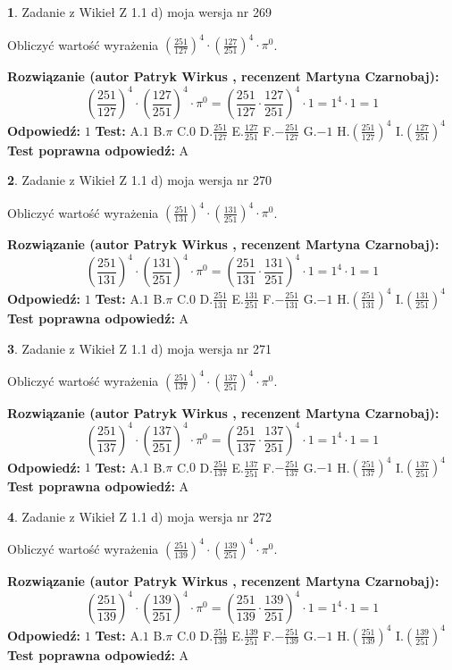 \documentclass[12pt, a4paper]{article}
\theoremstyle{definition} %
\newtheorem{zad}{}
\newcommand{\zadStart}[1]{\begin{zad}#1\newline}
\newcommand{\zadStop}{\end{zad}}
\newcommand{\rozwStart}[2]{\noindent \textbf{Rozwiązanie (autor #1 , recenzent #2): }\newline}
\newcommand{\rozwStop}{\newline}
\newcommand{\odpStart}{\noindent \textbf{Odpowiedź:}\newline}
\newcommand{\odpStop}{\newline}
\newcommand{\testStart}{\noindent \textbf{Test:}\newline}
\newcommand{\testStop}{\newline}
\newcommand{\kluczStart}{\noindent \textbf{Test poprawna odpowiedź:}\newline}
\newcommand{\kluczStop}{\newline}
\begin{document}
\zadStart{Zadanie z Wikieł Z 1.1 d) moja wersja nr 269}

Obliczyć wartość wyrażenia $(\frac{251}{127})^{4} \cdot (\frac{127}{251})^{4} \cdot \pi^{0}$.
\zadStop
\rozwStart{Patryk Wirkus}{Martyna Czarnobaj}
$$(\frac{251}{127})^{4} \cdot (\frac{127}{251})^{4} \cdot \pi^{0} = (\frac{251}{127} \cdot \frac{127}{251})^{4} \cdot 1 = 1^{4} \cdot 1 = 1$$
\rozwStop
\odpStart
$1$
\odpStop
\testStart
A.$1$ B.$\pi$ C.$0$ D.$\frac{251}{127}$ E.$\frac{127}{251}$
F.$-\frac{251}{127}$ G.$-1$
H.$(\frac{251}{127})^{4}$
I.$(\frac{127}{251})^{4}$
\testStop
\kluczStart
A
\kluczStop



\zadStart{Zadanie z Wikieł Z 1.1 d) moja wersja nr 270}

Obliczyć wartość wyrażenia $(\frac{251}{131})^{4} \cdot (\frac{131}{251})^{4} \cdot \pi^{0}$.
\zadStop
\rozwStart{Patryk Wirkus}{Martyna Czarnobaj}
$$(\frac{251}{131})^{4} \cdot (\frac{131}{251})^{4} \cdot \pi^{0} = (\frac{251}{131} \cdot \frac{131}{251})^{4} \cdot 1 = 1^{4} \cdot 1 = 1$$
\rozwStop
\odpStart
$1$
\odpStop
\testStart
A.$1$ B.$\pi$ C.$0$ D.$\frac{251}{131}$ E.$\frac{131}{251}$
F.$-\frac{251}{131}$ G.$-1$
H.$(\frac{251}{131})^{4}$
I.$(\frac{131}{251})^{4}$
\testStop
\kluczStart
A
\kluczStop



\zadStart{Zadanie z Wikieł Z 1.1 d) moja wersja nr 271}

Obliczyć wartość wyrażenia $(\frac{251}{137})^{4} \cdot (\frac{137}{251})^{4} \cdot \pi^{0}$.
\zadStop
\rozwStart{Patryk Wirkus}{Martyna Czarnobaj}
$$(\frac{251}{137})^{4} \cdot (\frac{137}{251})^{4} \cdot \pi^{0} = (\frac{251}{137} \cdot \frac{137}{251})^{4} \cdot 1 = 1^{4} \cdot 1 = 1$$
\rozwStop
\odpStart
$1$
\odpStop
\testStart
A.$1$ B.$\pi$ C.$0$ D.$\frac{251}{137}$ E.$\frac{137}{251}$
F.$-\frac{251}{137}$ G.$-1$
H.$(\frac{251}{137})^{4}$
I.$(\frac{137}{251})^{4}$
\testStop
\kluczStart
A
\kluczStop



\zadStart{Zadanie z Wikieł Z 1.1 d) moja wersja nr 272}

Obliczyć wartość wyrażenia $(\frac{251}{139})^{4} \cdot (\frac{139}{251})^{4} \cdot \pi^{0}$.
\zadStop
\rozwStart{Patryk Wirkus}{Martyna Czarnobaj}
$$(\frac{251}{139})^{4} \cdot (\frac{139}{251})^{4} \cdot \pi^{0} = (\frac{251}{139} \cdot \frac{139}{251})^{4} \cdot 1 = 1^{4} \cdot 1 = 1$$
\rozwStop
\odpStart
$1$
\odpStop
\testStart
A.$1$ B.$\pi$ C.$0$ D.$\frac{251}{139}$ E.$\frac{139}{251}$
F.$-\frac{251}{139}$ G.$-1$
H.$(\frac{251}{139})^{4}$
I.$(\frac{139}{251})^{4}$
\testStop
\kluczStart
A
\kluczStop
\end{document}
